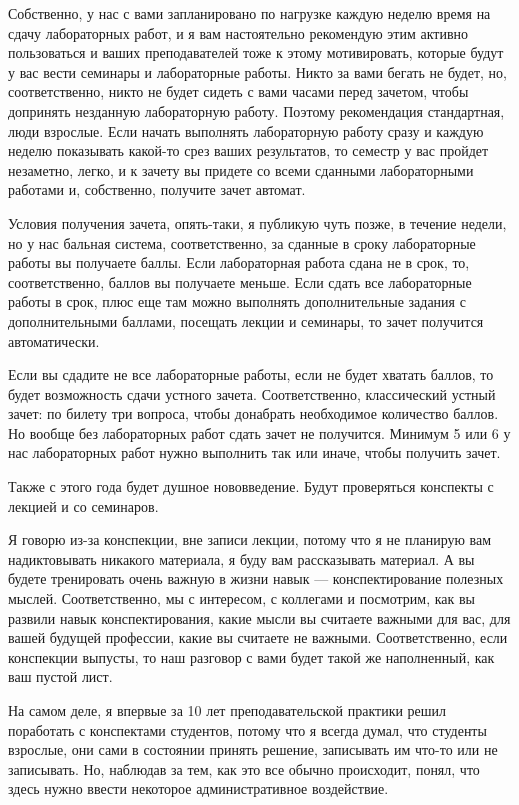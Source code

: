 Собственно, у нас с вами запланировано по нагрузке каждую неделю время на сдачу лабораторных работ, и я вам настоятельно рекомендую этим активно пользоваться и ваших преподавателей тоже к этому мотивировать, которые будут у вас вести семинары и лабораторные работы. Никто за вами бегать не будет, но, соответственно, никто не будет сидеть с вами часами перед зачетом, чтобы допринять незданную лабораторную работу. Поэтому рекомендация стандартная, люди взрослые. Если начать выполнять лабораторную работу сразу и каждую неделю показывать какой-то срез ваших результатов, то семестр у вас пройдет незаметно, легко, и к зачету вы придете со всеми сданными лабораторными работами и, собственно, получите зачет автомат.

Условия получения зачета, опять-таки, я публикую чуть позже, в течение недели, но у нас бальная система, соответственно, за сданные в сроку лабораторные работы вы получаете баллы. Если лабораторная работа сдана не в срок, то, соответственно, баллов вы получаете меньше. Если сдать все лабораторные работы в срок, плюс еще там можно выполнять дополнительные задания с дополнительными баллами, посещать лекции и семинары, то зачет получится автоматически.

Если вы сдадите не все лабораторные работы, если не будет хватать баллов, то будет возможность сдачи устного зачета. Соответственно, классический устный зачет: по билету три вопроса, чтобы донабрать необходимое количество баллов. Но вообще без лабораторных работ сдать зачет не получится. Минимум 5 или 6 у нас лабораторных работ нужно выполнить так или иначе, чтобы получить зачет.

Также с этого года будет душное нововведение. Будут проверяться конспекты с лекцией и со семинаров.

Я говорю из-за конспекции, вне записи лекции, потому что я не планирую вам надиктовывать никакого материала, я буду вам рассказывать материал. А вы будете тренировать очень важную в жизни навык --- конспектирование полезных мыслей. Соответственно, мы с интересом, с коллегами и посмотрим, как вы развили навык конспектирования, какие мысли вы считаете важными для вас, для вашей будущей профессии, какие вы считаете не важными. Соответственно, если конспекции выпусты, то наш разговор с вами будет такой же наполненный, как ваш пустой лист. 

На самом деле, я впервые за 10 лет преподавательской практики решил поработать с конспектами студентов, потому что я всегда думал, что студенты взрослые, они сами в состоянии принять решение, записывать им что-то или не записывать. Но, наблюдав за тем, как это все обычно происходит, понял, что здесь нужно ввести некоторое административное воздействие. 

